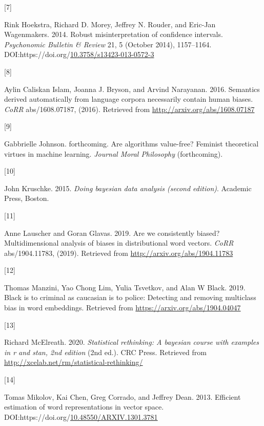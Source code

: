 \documentclass[
  10pt,
  dvipsnames,enabledeprecatedfontcommands]{scrartcl}
\newlength{\cslhangindent}
\newlength{\csllabelwidth}
\newlength{\cslentryspacingunit} %
\newenvironment{CSLReferences}[2] %
 {%
  \setlength{\parindent}{0pt}
  \ifodd #1
  \let\oldpar\par
  \def\par{\hangindent=\cslhangindent\oldpar}
  \fi
  \setlength{\parskip}{#2\cslentryspacingunit}
 }%
 {}
\newcommand{\CSLLeftMargin}[1]{\parbox[t]{\csllabelwidth}{#1}}
\newcommand{\CSLRightInline}[1]{\parbox[t]{\linewidth - \csllabelwidth}{#1}\break}
\begin{document}
\begin{CSLReferences}{0}{0}
\leavevmode{}%
\CSLLeftMargin{{[}7{]} }%
\CSLRightInline{Rink Hoekstra, Richard D. Morey, Jeffrey N. Rouder, and
Eric-Jan Wagenmakers. 2014. Robust misinterpretation of confidence
intervals. \emph{Psychonomic Bulletin \& Review} 21, 5 (October 2014),
1157--1164.
DOI:https://doi.org/\href{https://doi.org/10.3758/s13423-013-0572-3}{10.3758/s13423-013-0572-3}}

\leavevmode{}%
\CSLLeftMargin{{[}8{]} }%
\CSLRightInline{Aylin Caliskan Islam, Joanna J. Bryson, and Arvind
Narayanan. 2016. Semantics derived automatically from language corpora
necessarily contain human biases. \emph{CoRR} abs/1608.07187, (2016).
Retrieved from \url{http://arxiv.org/abs/1608.07187}}

\leavevmode{}%
\CSLLeftMargin{{[}9{]} }%
\CSLRightInline{Gabbrielle Johnson. forthcoming. Are algorithms
value-free? Feminist theoretical virtues in machine learning.
\emph{Journal Moral Philosophy} (forthcoming).}

\leavevmode{}%
\CSLLeftMargin{{[}10{]} }%
\CSLRightInline{John Kruschke. 2015. \emph{Doing bayesian data analysis
(second edition)}. Academic Press, Boston.}

\leavevmode{}%
\CSLLeftMargin{{[}11{]} }%
\CSLRightInline{Anne Lauscher and Goran Glavas. 2019. Are we
consistently biased? Multidimensional analysis of biases in
distributional word vectors. \emph{CoRR} abs/1904.11783, (2019).
Retrieved from \url{http://arxiv.org/abs/1904.11783}}

\leavevmode{}%
\CSLLeftMargin{{[}12{]} }%
\CSLRightInline{Thomas Manzini, Yao Chong Lim, Yulia Tsvetkov, and Alan
W Black. 2019. Black is to criminal as caucasian is to police: Detecting
and removing multiclass bias in word embeddings. Retrieved from
\url{https://arxiv.org/abs/1904.04047}}

\leavevmode{}%
\CSLLeftMargin{{[}13{]} }%
\CSLRightInline{Richard McElreath. 2020. \emph{Statistical rethinking: A
bayesian course with examples in r and stan, 2nd edition} (2nd ed.). CRC
Press. Retrieved from
\url{http://xcelab.net/rm/statistical-rethinking/}}

\leavevmode{}%
\CSLLeftMargin{{[}14{]} }%
\CSLRightInline{Tomas Mikolov, Kai Chen, Greg Corrado, and Jeffrey Dean.
2013. Efficient estimation of word representations in vector space.
DOI:https://doi.org/\href{https://doi.org/10.48550/ARXIV.1301.3781}{10.48550/ARXIV.1301.3781}}


\end{CSLReferences}
\end{document}
